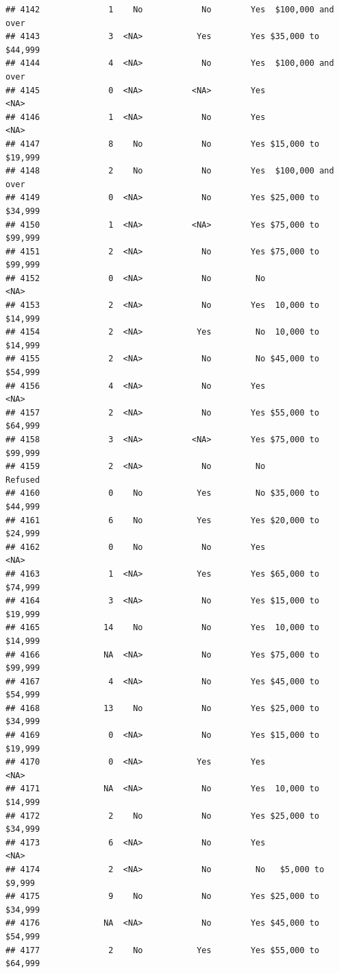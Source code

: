 \documentclass[man]{apa6}
\begin{document}
\begin{verbatim}
## 4142              1    No            No        Yes  $100,000 and over
## 4143              3  <NA>           Yes        Yes $35,000 to $44,999
## 4144              4  <NA>            No        Yes  $100,000 and over
## 4145              0  <NA>          <NA>        Yes               <NA>
## 4146              1  <NA>            No        Yes               <NA>
## 4147              8    No            No        Yes $15,000 to $19,999
## 4148              2    No            No        Yes  $100,000 and over
## 4149              0  <NA>            No        Yes $25,000 to $34,999
## 4150              1  <NA>          <NA>        Yes $75,000 to $99,999
## 4151              2  <NA>            No        Yes $75,000 to $99,999
## 4152              0  <NA>            No         No               <NA>
## 4153              2  <NA>            No        Yes  10,000 to $14,999
## 4154              2  <NA>           Yes         No  10,000 to $14,999
## 4155              2  <NA>            No         No $45,000 to $54,999
## 4156              4  <NA>            No        Yes               <NA>
## 4157              2  <NA>            No        Yes $55,000 to $64,999
## 4158              3  <NA>          <NA>        Yes $75,000 to $99,999
## 4159              2  <NA>            No         No            Refused
## 4160              0    No           Yes         No $35,000 to $44,999
## 4161              6    No           Yes        Yes $20,000 to $24,999
## 4162              0    No            No        Yes               <NA>
## 4163              1  <NA>           Yes        Yes $65,000 to $74,999
## 4164              3  <NA>            No        Yes $15,000 to $19,999
## 4165             14    No            No        Yes  10,000 to $14,999
## 4166             NA  <NA>            No        Yes $75,000 to $99,999
## 4167              4  <NA>            No        Yes $45,000 to $54,999
## 4168             13    No            No        Yes $25,000 to $34,999
## 4169              0  <NA>            No        Yes $15,000 to $19,999
## 4170              0  <NA>           Yes        Yes               <NA>
## 4171             NA  <NA>            No        Yes  10,000 to $14,999
## 4172              2    No            No        Yes $25,000 to $34,999
## 4173              6  <NA>            No        Yes               <NA>
## 4174              2  <NA>            No         No   $5,000 to $9,999
## 4175              9    No            No        Yes $25,000 to $34,999
## 4176             NA  <NA>            No        Yes $45,000 to $54,999
## 4177              2    No           Yes        Yes $55,000 to $64,999

\end{verbatim}
\end{document}
